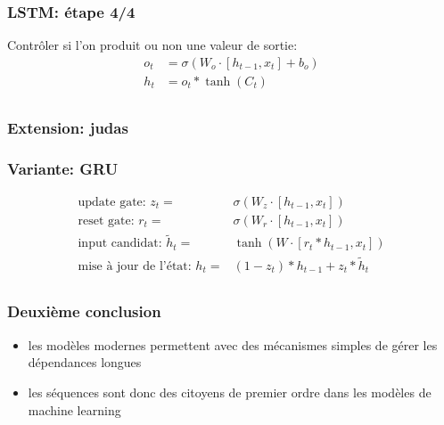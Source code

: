 \documentclass{formation}
\begin{document}
\begin{frame}
  \frametitle{LSTM: étape 4/4}
  Contrôler si l'on produit ou non une valeur de sortie:
  \begin{align*}
    o_t & = \sigma(W_o\cdot [h_{t-1}, x_t] + b_o) \\
    h_t & = o_t * \tanh(C_t) \\    
  \end{align*}
\end{frame}

\begin{frame}
  \frametitle{Extension: judas}
  
\end{frame}

\begin{frame}
  \frametitle{Variante: GRU}
  
  \begin{align*}
    \text{update gate: } z_t         =           & \sigma(W_z\cdot [h_{t-1}, x_t])         \\
    \text{reset gate: }  r_t         =           & \sigma(W_r\cdot [h_{t-1}, x_t])         \\
    \text{input candidat: } \tilde{h}_t =        & \tanh(W \cdot [r_t * h_{t-1}, x_t])     \\
    \text{mise à jour de l'état: } h_t         = & (1 - z_t) * h_{t-1} + z_t * \tilde{h}_t \\
  \end{align*}
\end{frame}

\begin{frame}
  \frametitle{Deuxième conclusion}
  \begin{itemize}
  \item les modèles modernes permettent avec des mécanismes simples de
    gérer les dépendances longues
  \item les séquences sont donc des citoyens de premier ordre dans les
    modèles de machine learning
  \end{itemize}
\end{frame}
\end{document}
